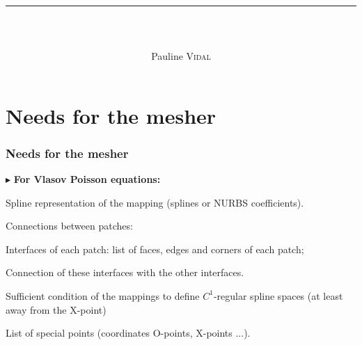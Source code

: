 \documentclass[t,10pt,a3paper]{beamer} %
\title{ \textbf{\textsc{ }} \\\rule{\linewidth}{0.1mm} }
\subtitle{ \\ \quad }
\author{Pauline \textsc{Vidal}}
\date{}
\begin{document}

\fontsize{8}{8}




\section{Needs for the mesher}
\begin{frame} %
\frametitle{\color{vert}\textbf{Needs for the mesher}}
\footnotesize	

\vspace*{0.25cm}
{\color{vert}$\blacktriangleright$ }
\textbf{For Vlasov Poisson equations:}

\vspace*{0.15cm}

\qquad {\color{vert}$\triangleright$} Spline representation of the mapping (splines or NURBS coefficients). \par 

\vspace*{0.15cm}
\qquad {\color{vert}$\triangleright$} Connections between patches: \par 
\qquad \qquad {\color{vert}$\bullet$} Interfaces of each patch: list of faces, edges and corners of each patch; \par
\qquad \qquad {\color{vert}$\bullet$} Connection of these interfaces with the other interfaces. \par 
\qquad \qquad {\color{vert}$\bullet$} Sufficient condition of the mappings to define $C^1$-regular 
									  spline spaces (at least away from the X-point) \par 

\vspace*{0.15cm}
\qquad {\color{vert}$\triangleright$} List of special points (coordinates O-points, X-points ...).


\end{frame}
\end{document}
